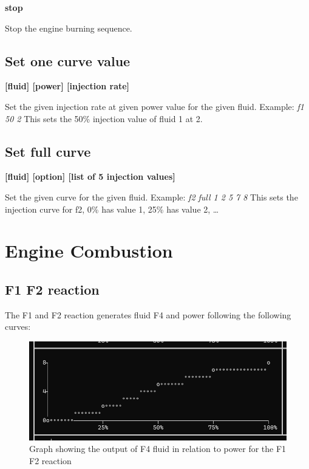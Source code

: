 \documentclass[12pt]{article}
\begin{document}
\begin{tcolorbox}[arc=0mm]
    \textbf{stop}
\end{tcolorbox}
Stop the engine burning sequence.

\subsection{Set one curve value}
\begin{tcolorbox}[arc=0mm]
    \textbf{[fluid] [power] [injection rate]\newline
    [f1, f2, f4] [0, 25, 50, 75, 100] [0, 1, 2, 3, 4, 5, 6, 7, 8]}
\end{tcolorbox}
Set the given injection rate at given power value for the given fluid.\newline
Example: \emph{f1 50 2} This sets the 50\% injection value of fluid 1 at 2.

\subsection{Set full curve}
\begin{tcolorbox}[arc=0mm]
    \textbf{[fluid] [option] [list of 5 injection values]\newline
    [f1, f2, f4] [full, f] [0, 1, 2, 3, 4, 5, 6, 7, 8]}
\end{tcolorbox}
Set the given curve for the given fluid.\newline
Example: \emph{f2 full 1 2 5 7 8} This sets the injection curve for f2, 0\% has value 1, 25\% has value 2, \dots


\newpage
\section{Engine Combustion}
\subsection{F1 F2 reaction}
The F1 and F2 reaction generates fluid F4 and power following the following curves:

\begin{figure}[!htb]
    \center\includegraphics[width=\linewidth]{images/f1f2_f4.png}
    \caption{Graph showing the output of F4 fluid in relation to power for the F1 F2 reaction}
\end{figure}
\end{document}
